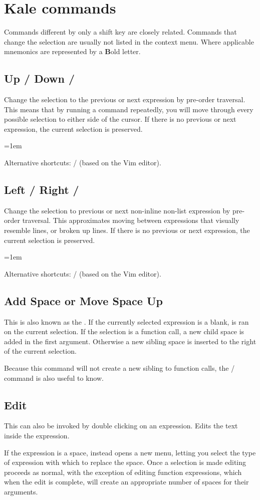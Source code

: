 \chapter{Kale commands}
\newcommand{\shortcut}[3]{\section[#1]{#1 \hfill #2}\label{cmd:#3}}
\newcommand{\pskip}[1]{{\parskip=1em\par\noindent #1}}

Commands different by only a shift key \keys{\shift} are closely
related. Commands that change the selection are usually not listed in the
context menu. Where applicable mnemonics are represented by a \textbf{B}old
letter.

\shortcut{Up / Down}{\ak{^} / }{up_down}
Change the selection to the previous or next expression by pre-order traversal.
This means that by running a command repeatedly, you will move through every
possible selection to either side of the cursor. If there is no previous or
next expression, the current selection is preserved.
\pskip{Alternative shortcuts:  /  (based on the Vim editor).}

\shortcut{Left / Right}{\ak{<} / \ak{>}}{left_right}
Change the selection to previous or next non-inline non-list expression by
pre-order traversal. This approximates moving between expressions that visually
resemble lines, or broken up lines. If there is no previous or next expression,
the current selection is preserved.
\pskip{Alternative shortcuts:  /  (based on the Vim editor).}

\shortcut{Add Space or Move Space Up}{\keys{\SPACE}}{smart_space}
This is also known as the . If the currently selected
expression is a blank, \hyperref[cmd:move_up]{} is ran on the
current selection. If the selection is a function call, a new child space
is added in the first argument. Otherwise a new sibling space is inserted to
the right of the current selection. 

Because this command will not create a new sibling to function calls, the 
\hyperref[cmd:new_line]{}
 /  
command is also useful to know.

\shortcut{Edit}{\keys{\return}}{edit}
This can also be invoked by double clicking on an expression. Edits the text
inside the expression.

If the expression is a space, instead opens a new menu,
letting you select the type of expression with which to replace the space. 
Once a selection is made editing proceeds as normal, with the exception of
editing function expressions, which when the edit is complete, will create
an appropriate number of spaces for their arguments.

